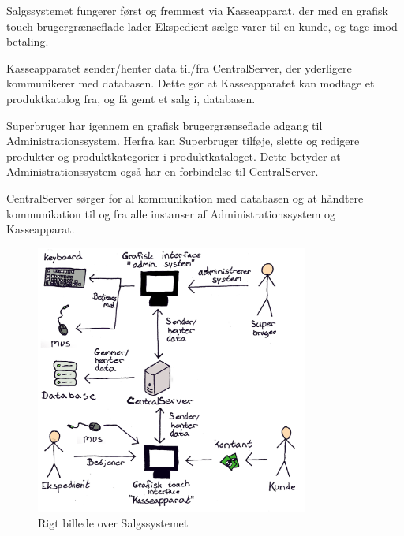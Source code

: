 Salgssystemet fungerer først og fremmest via Kasseapparat, der med en grafisk touch brugergrænseflade lader Ekspedient sælge varer til en kunde, og tage imod betaling. 

Kasseapparatet sender/henter data til/fra CentralServer, der yderligere kommunikerer med databasen. Dette gør at Kasseapparatet kan modtage et produktkatalog fra, og få gemt et salg i, databasen. 

Superbruger har igennem en grafisk brugergrænseflade adgang til Administrationssystem. Herfra kan Superbruger tilføje, slette og redigere produkter og produktkategorier i produktkataloget. Dette betyder at Administrationssystem også har en forbindelse til CentralServer.

CentralServer sørger for al kommunikation med databasen og at håndtere kommunikation til og fra alle instanser af Administrationssystem og Kasseapparat.


\begin{figure}[!h]
    \centering
    \includegraphics[width=0.8\textwidth]{Systembeskrivelse/RigtBillede3}
    \caption{Rigt billede over Salgssystemet}
    \label{fig:Rigtbill}
\end{figure}